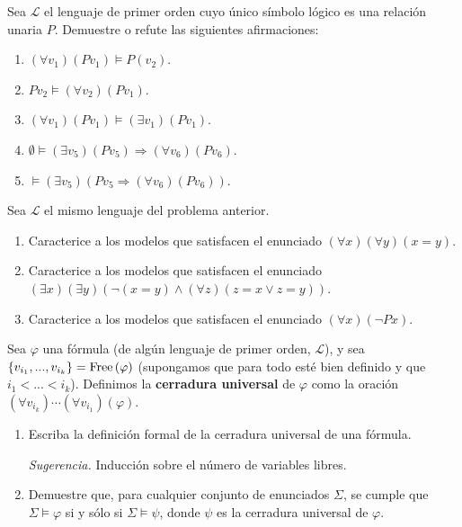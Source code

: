 \documentclass[12pt]{report}
\newcounter{it}
\theoremstyle{largebreak}
\newcommand{\free}{\textup{Free}}
\begin{document}
    \begin{excer}
        Sea $\mathcal{L}$ el lenguaje de primer orden cuyo único símbolo lógico es una relación unaria $P$. Demuestre o refute las siguientes afirmaciones:
        \begin{enumerate}[label=$(\alph*)$]
            \item $(\forall v_1)(Pv_1)\vDash P(v_2)$.
            \item $Pv_2\vDash(\forall v_2)(Pv_1)$.
            \item $(\forall v_1)(Pv_1)\vDash(\exists v_1)(Pv_1)$.
            \item $\emptyset\vDash(\exists v_5)(Pv_5)\Rightarrow(\forall v_6)(Pv_6)$.
            \item $\vDash(\exists v_5)(Pv_5\Rightarrow(\forall v_6)(Pv_6))$.
        \end{enumerate}
    \end{excer}

    \begin{sol}
    \end{sol}

    \begin{excer}
        Sea $\mathcal{L}$ el mismo lenguaje del problema anterior.
        \begin{enumerate}[label=$(\alph*)$]
            \item Caracterice a los modelos que satisfacen el enunciado $(\forall x)(\forall y)(x=y)$.
            \item Caracterice a los modelos que satisfacen el enunciado $(\exists x)(\exists y)(\neg(x=y)\land(\forall z)(z=x\lor z=y))$.
            \item Caracterice a los modelos que satisfacen el enunciado $(\forall x)(\neg Px)$.
        \end{enumerate}
    \end{excer}

    \begin{sol}
    \end{sol}

    \begin{excer}
        Sea $\varphi$ una fórmula (de algún lenguaje de primer orden, $\mathcal{L}$), y sea $\left\{v_{ i_1},...,v_{ i_k} \right\}=\free\left(\varphi\right)$ (supongamos que para todo esté bien definido y que $i_1<...<i_k$). Definimos la \textbf{cerradura universal} de $\varphi$ como la oración $(\forall v_{ i_k})\cdots(\forall v_{ i_1})(\varphi)$.
        \begin{enumerate}[label=$(\alph*)$]
            \item Escriba la definición formal de la cerradura universal de una fórmula.
            
            \textit{Sugerencia.} Inducción sobre el número de variables libres.
            \item Demuestre que, para cualquier conjunto de enunciados $\Sigma$, se cumple que $\Sigma\vDash\varphi$ si y sólo si $\Sigma\vDash\psi$, donde $\psi$ es la cerradura universal de $\varphi$.
        \end{enumerate}
    \end{excer}
\end{document}
